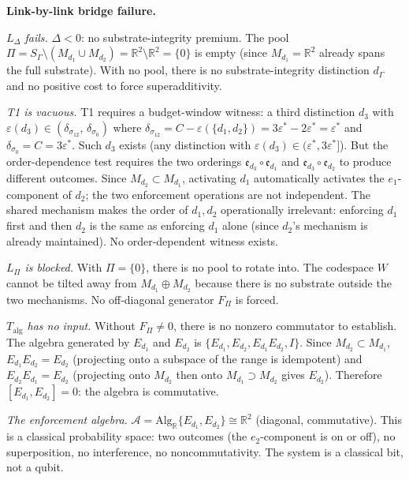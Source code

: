 \documentclass[11pt]{article}
\theoremstyle{remark}
\begin{document}
\medskip\noindent\textbf{Link-by-link bridge failure.}

\textit{$L_\Delta$ fails.}  $\Delta < 0$: no substrate-integrity premium.  The pool $\Pi = S_\Gamma \setminus (M_{d_1} \cup M_{d_2}) = \mathbb{R}^2 \setminus \mathbb{R}^2 = \{0\}$ is empty (since $M_{d_1} = \mathbb{R}^2$ already spans the full substrate).  With no pool, there is no substrate-integrity distinction $d_\Gamma$ and no positive cost to force superadditivity.

\textit{T1 is vacuous.}  T1 requires a budget-window witness: a third distinction $d_3$ with $\varepsilon(d_3) \in (\delta_{\sigma_{12}},\, \delta_{\sigma_0})$ where $\delta_{\sigma_{12}} = C - \varepsilon(\{d_1,d_2\}) = 3\varepsilon^* - 2\varepsilon^* = \varepsilon^*$ and $\delta_{\sigma_0} = C = 3\varepsilon^*$.  Such $d_3$ exists (any distinction with $\varepsilon(d_3) \in (\varepsilon^*, 3\varepsilon^*]$).  But the order-dependence test requires the two orderings $\mathfrak{e}_{d_3} \circ \mathfrak{e}_{d_1}$ and $\mathfrak{e}_{d_3} \circ \mathfrak{e}_{d_2}$ to produce different outcomes.  Since $M_{d_2} \subset M_{d_1}$, activating $d_1$ automatically activates the $e_1$-component of $d_2$; the two enforcement operations are not independent.  The shared mechanism makes the order of $d_1, d_2$ operationally irrelevant: enforcing $d_1$ first and then $d_2$ is the same as enforcing $d_1$ alone (since $d_2$'s mechanism is already maintained).  No order-dependent witness exists.

\textit{$L_\Pi$ is blocked.}  With $\Pi = \{0\}$, there is no pool to rotate into.  The codespace $W$ cannot be tilted away from $M_{d_1} \oplus M_{d_2}$ because there is no substrate outside the two mechanisms.  No off-diagonal generator $F_\Pi$ is forced.

\textit{$T_{\mathrm{alg}}$ has no input.}  Without $F_\Pi \ne 0$, there is no nonzero commutator to establish.  The algebra generated by $E_{d_1}$ and $E_{d_2}$ is $\{E_{d_1}, E_{d_2}, E_{d_1}E_{d_2}, I\}$.  Since $M_{d_2} \subset M_{d_1}$, $E_{d_1}E_{d_2} = E_{d_2}$ (projecting onto a subspace of the range is idempotent) and $E_{d_2}E_{d_1} = E_{d_2}$ (projecting onto $M_{d_2}$ then onto $M_{d_1} \supset M_{d_2}$ gives $E_{d_2}$).  Therefore $[E_{d_1}, E_{d_2}] = 0$: the algebra is commutative.

\textit{The enforcement algebra.}  $\mathcal{A} = \mathrm{Alg}_\mathbb{R}\{E_{d_1}, E_{d_2}\} \cong \mathbb{R}^2$ (diagonal, commutative).  This is a classical probability space: two outcomes (the $e_2$-component is on or off), no superposition, no interference, no noncommutativity.  The system is a classical bit, not a qubit.
\end{document}
